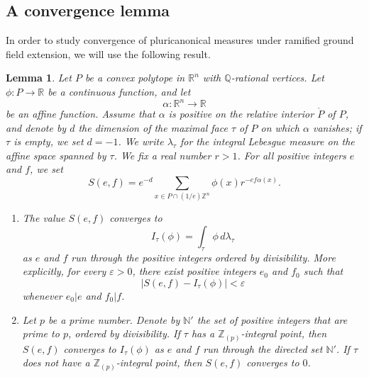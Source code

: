 \documentclass[11pt]{article}
\newtheorem{lemma}[equation]{Lemma}
\theoremstyle{definition}
\numberwithin{equation}{subsection}
\newcommand{\N}{\ensuremath{\mathbb{N}}}
\newcommand{\Z}{\ensuremath{\mathbb{Z}}}
\newcommand{\Q}{\ensuremath{\mathbb{Q}}}
\newcommand{\R}{\ensuremath{\mathbb{R}}}
\begin{document}
\subsection{A convergence lemma}
In order to study convergence of pluricanonical measures under ramified ground field extension, we will use the following result.
\begin{lemma}\label{lemm:int}
Let $P$ be a convex polytope in $\R^n$ with $\Q$-rational vertices. Let $\phi\colon P\to \R$ be a continuous function, and let
\[
\alpha\colon \R^{n}\to \R
\]
be an affine function.
Assume that $\alpha$ is positive on the relative interior $\mathring{P}$ of $P$, and denote by $d$ the dimension of the maximal face $\tau$ of $P$ on which $\alpha$ vanishes; if $\tau$ is empty, we set $d=-1$.
We write $\lambda_{\tau}$ for the integral Lebesgue measure on the affine space spanned by $\tau$.
We fix a real number $r>1$. For all positive integers $e$ and $f$, we set
\[
S(e,f)=e^{-d}\sum_{x\in P\cap (1/e)\Z^n}\phi(x)r^{-ef\alpha(x)}.
\]

\begin{enumerate}
\item \label{it:convwild} The value $S(e,f)$ converges to
\[
I_{\tau}(\phi)=\int_{\tau}\phi\, d\lambda_{\tau}
\]
as $e$ and $f$ run through the positive integers ordered by divisibility. More explicitly, for every $\varepsilon>0$, there exist positive integers $e_0$ and $f_0$ such that
\[
|S(e,f)-I_{\tau}(\phi)|<\varepsilon
\]
whenever $e_0|e$ and $f_0|f$.

\item \label{it:convtame} Let $p$ be a prime number. Denote by $\N'$ the set of positive integers that are prime to $p$, ordered by divisibility. If $\tau$ has a $\Z_{(p)}$-integral point, then
$S(e,f)$ converges to $I_{\tau}(\phi)$ as $e$ and $f$ run through the directed set $\N'$. If $\tau$ does not have a $\Z_{(p)}$-integral point, then $S(e,f)$ converges to $0$.
\end{enumerate}
\end{lemma}
\end{document}
